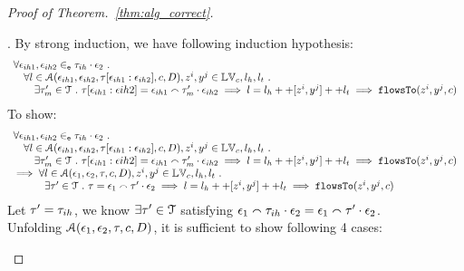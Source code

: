 \documentclass[a4paper,11pt]{article}
\begin{document}
\begin{proof}[Proof of Theorem.~\ref{thm:alg_correct}]
\begin{case}
\end{case}
%
\begin{case}
[$\trace = \event_1 \tracecat \trace_{ih} \cdot \event_2 \land \trace_{ih} \neq \cdot$].
By strong induction, we have following induction hypothesis:
%
\[
\begin{array}{l}
  \forall \mathtt{\epsilon}_{ih1}, \mathtt{\epsilon}_{ih2} \in_{\mathtt{e}} \mathtt{\tau}_{ih} \cdot \mathtt{\epsilon}_2 ~.~
  \\ \quad 
   \forall l \in \mathcal{A}(\mathtt{\epsilon}_{ih1}, \mathtt{\epsilon}_{ih2}, \mathtt{\tau}[\mathtt{\epsilon}_{ih1}:\mathtt{\epsilon}_{ih2}], c, D),  z^i, y^j \in \mathbb{LV}_c, l_h, l_t ~.~ 
   \\ \qquad
   \exists \mathtt{\tau}_{m}' \in \mathcal{T} ~.~ 
   \mathtt{\tau}[\mathtt{\epsilon}_{ih1}:\mathtt{\epsilon}{ih2}] = \mathtt{\epsilon}_{ih1} \smallfrown \mathtt{\tau}_{m}' \cdot \mathtt{\epsilon}_{ih2}
   \implies l = l_h ++ [z^i, y^j] ++ l_t 
   \implies \mathtt{flowsTo}(z^i, y^j, c)
\end{array}
\]
%
To show:
\[
\begin{array}{l}
  \forall \mathtt{\epsilon}_{ih1}, \mathtt{\epsilon}_{ih2} \in_{\mathtt{e}} \mathtt{\tau}_{ih} \cdot \mathtt{\epsilon}_2 ~.~
  \\ \quad 
   \forall l \in \mathcal{A}(\mathtt{\epsilon}_{ih1}, \mathtt{\epsilon}_{ih2}, \mathtt{\tau}[\mathtt{\epsilon}_{ih1}:\mathtt{\epsilon}_{ih2}], c, D), z^i, y^j \in \mathbb{LV}_c, l_h, l_t ~.~ 
   \\ \qquad
   \exists \mathtt{\tau}_{m}' \in \mathcal{T} ~.~ 
   \mathtt{\tau}[\mathtt{\epsilon}_{ih1}:\mathtt{\epsilon}{ih2}] = \mathtt{\epsilon}_{ih1} \smallfrown \mathtt{\tau}_{m}' \cdot \mathtt{\epsilon}_{ih2}
   \implies l = l_h ++ [z^i, y^j] ++ l_t 
   \implies \mathtt{flowsTo}(z^i, y^j, c)
   \\
   \implies
   \forall l \in \mathcal{A}(\mathtt{\epsilon}_1, \mathtt{\epsilon}_2, \mathtt{\tau}, c, D),  z^i, y^j \in \mathbb{LV}_c, l_h, l_t ~.~
   \\ \quad \qquad 
   \exists \mathtt{\tau}' \in \mathcal{T} ~.~ \mathtt{\tau} = \mathtt{\epsilon}_1 \smallfrown \mathtt{\tau}' \cdot \mathtt{\epsilon}_2
   \implies l = l_h ++ [z^i, y^j] ++ l_t 
   \implies \mathtt{flowsTo}(z^i, y^j, c)  
\end{array}
\]
%
Let $\mathtt{\tau}' = \mathtt{\tau}_{ih}$, we know $\exists \mathtt{\tau}' \in \mathcal{T}$ satisfying 
$\mathtt{\epsilon}_1  {}\smallfrown \mathtt{\tau}_{ih} \cdot {} \mathtt{\epsilon}_2 = \mathtt{\epsilon}_1 \smallfrown \mathtt{\tau}' \cdot \mathtt{\epsilon}_2$.
\\
Unfolding $\mathcal{A}(\mathtt{\epsilon}_1, \mathtt{\epsilon}_2, \mathtt{\tau}, c, D)$, it is sufficient to show following 4 cases:

\end{case}
\end{proof}
\end{document}
